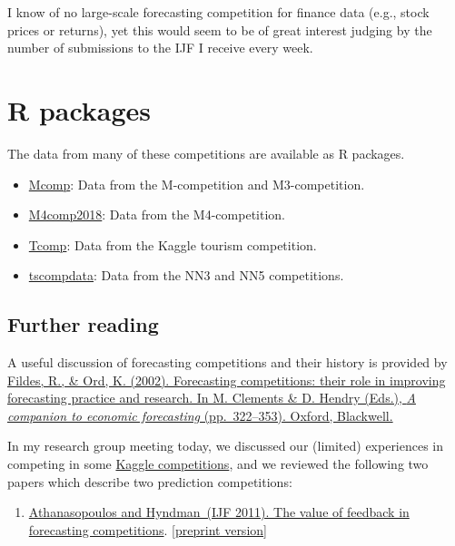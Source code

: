 \documentclass[11pt,a4paper,]{article}
\providecommand{\tightlist}{%
  \setlength{\itemsep}{0pt}\setlength{\parskip}{0pt}}
\begin{document}
I know of no large-scale forecasting competition for finance data (e.g., stock prices or returns), yet this would seem to be of great interest judging by the number of submissions to the IJF I receive every week.

\hypertarget{r-packages}{%
\section{R packages}\label{r-packages}}

The data from many of these competitions are available as R packages.

\begin{itemize}
\tightlist
\item
  \href{http://pkg.robjhyndman.com/Mcomp/}{Mcomp}: Data from the M-competition and M3-competition.
\item
  \href{https://github.com/carlanetto/M4comp2018}{M4comp2018}: Data from the M4-competition.
\item
  \href{https://cran.r-project.org/package=Tcomp}{Tcomp}: Data from the Kaggle tourism competition.
\item
  \href{https://github.com/robjhyndman/tscompdata}{tscompdata}: Data from the NN3 and NN5 competitions.
\end{itemize}

\hypertarget{further-reading}{%
\subsection{Further reading}\label{further-reading}}

A useful discussion of forecasting competitions and their history is provided by \href{https://doi.org/10.1002/9780470996430.ch15}{Fildes, R., \& Ord, K. (2002). Forecasting competitions: their role in improving forecasting practice and research. In M. Clements \& D. Hendry (Eds.), \emph{A companion to economic forecasting} (pp.~322--353). Oxford, Blackwell.}

In my research group meeting today, we discussed our (limited) experiences in competing in some \href{https://www.kaggle.com/competitions}{Kaggle competitions}, and we reviewed the following two papers which describe two prediction competitions:

\begin{enumerate}
\def\labelenumi{\arabic{enumi}.}
\tightlist
\item
  \href{http://dx.doi.org/10.1016/j.ijforecast.2011.03.002}{Athanasopoulos and Hyndman~(IJF 2011). The value of feedback in forecasting competitions}. {[}\href{/papers/kaggle.pdf}{preprint version}{]}
\end{enumerate}
\end{document}
